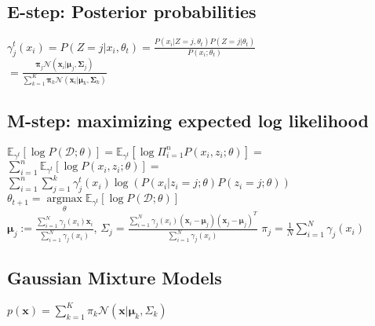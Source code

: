 \subsection*{E-step: Posterior probabilities}
$\gamma_j^t(x_i) = P(Z=j|x_i, \theta_t) = \frac{P(x_i|Z=j, \theta_t) P(Z=j|\theta_t)}{P(x_i;\theta_t)}$ \\
$= \frac{\boldsymbol{\pi}_j \mathcal{N}(\mathbf{x}_i | \boldsymbol{\mu}_j, \boldsymbol{\Sigma}_j)}{\sum_{k=1}^K \boldsymbol{\pi}_k \mathcal{N}(\mathbf{x}_i | \boldsymbol{\mu}_k, \boldsymbol{\Sigma}_k)}$

\subsection*{M-step: maximizing expected log likelihood}
$\mathbb{E}_{\gamma^t}[\log P(\mathcal{D;\theta})] = 
\mathbb{E}_{\gamma^t}[\log \Pi_{i=1}^nP(x_i,z_i;\theta)] = $ \\
$\sum_{i=1}^n \mathbb{E}_{\gamma^t}[\log P(x_i,z_i;\theta)] = $ \\
$\sum_{i=1}^n \sum_{j=1}^k \gamma_j^t(x_i) \log (P(x_i|z_i=j;\theta) P(z_i=j;\theta))$ \\
$\theta_{t+1} = \underset{\theta}{\operatorname{argmax}} \mathbb{E}_{\gamma^t}[\log P(\mathcal{D;\theta})]$ \\
$\boldsymbol{\mu}_j:=\frac{\sum_{i=1}^N \gamma_j(x_i) \mathbf{x}_i}{\sum_{i=1}^N \gamma_j(x_i)}$, $\Sigma_j = \frac{\sum_{i=1}^N \gamma_j(x_i) (\mathbf{x}_i - \boldsymbol{\mu}_j)(\mathbf{x}_j - \boldsymbol{\mu}_j)^T}{\sum_{i=1}^N \gamma_j(x_i)}$
$\pi_j = \frac{1}{N}\sum_{i=1}^{N}\gamma_j(x_i)$

\subsection*{Gaussian Mixture Models }
$p(\mathbf{x}) = \sum_{k=1}^K \pi_k \mathcal{N}(\mathbf{x} | \boldsymbol{\mu}_k, \Sigma_k)$

